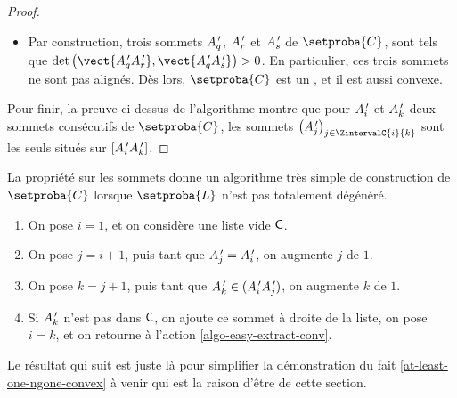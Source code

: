 \begin{proof}
\begin{itemize}
        \item Par construction, trois sommets  $A^{\,\prime}_q$, $A^{\,\prime}_r$ et $A^{\,\prime}_s$ de $\setproba{C}$, sont tels que $\det \big( \vect{\primeit{A}_q \primeit{A}_{r}}, \vect{\primeit{A}_q \primeit{A}_s} \big) > 0$. 
        En particulier, ces trois sommets  ne sont pas alignés.
        Dès lors, $\setproba{C}$ est un \kgone, et il est aussi convexe.
    \end{itemize}

	
	Pour finir, la preuve ci-dessus de l'algorithme montre que pour $A^{\,\prime}_i$ et $A^{\,\prime}_k$ deux sommets consécutifs de $\setproba{C}$, les sommets $\big( \primeit{A}_j \big)_{ j \in \ZintervalC{i}{k} }$ sont les seuls situés sur $[A^{\,\prime}_i A^{\,\prime}_k]$.
\end{proof}


\begin{remark}
    La propriété sur les sommets donne un algorithme très simple de construction de $\setproba{C}$ lorsque $\setproba{L}$ n'est pas totalement dégénéré.
    \begin{enumerate}[label=\fbox{\small\bfseries\textsf{A\kern.25pt\arabic*}}]
        \item On pose $i = 1$, et on considère une liste vide $\mathsf{C}$.

        \item \label{algo-easy-extract-conv}
              On pose $j = i + 1$,
              puis
              tant que $A^{\,\prime}_j = A^{\,\prime}_i$, on augmente $j$ de $1$.

        \item On pose $k = j + 1$,
              puis
              tant que $A^{\,\prime}_k \in (A^{\,\prime}_i A^{\,\prime}_j)$, on augmente $k$ de $1$.

        \item Si $A^{\,\prime}_k$ n'est pas dans $\mathsf{C}$, on ajoute ce sommet à droite de la liste, on pose $i = k$, et on retourne à l'action \ref{algo-easy-extract-conv}.
    \end{enumerate}
\end{remark}




%

Le résultat qui suit est juste là pour simplifier la démonstration du fait \ref{at-least-one-ngone-convex} à venir qui est la raison d'être de cette section.


